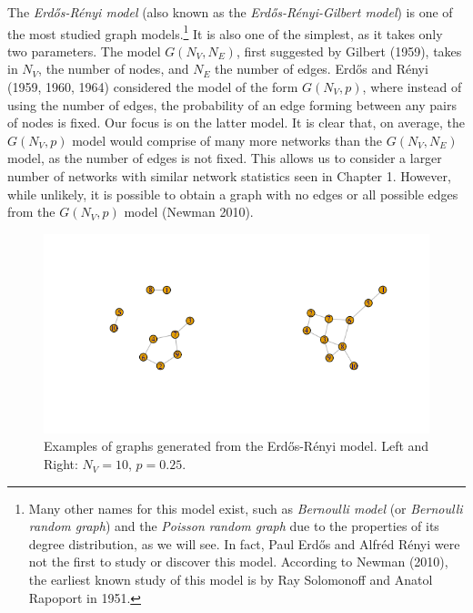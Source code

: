 \documentclass[12pt,twoside]{amherstthesis}
\begin{document}
  The \emph{Erdős-Rényi model} (also known as the
  \emph{Erdős-Rényi-Gilbert model}) is one of the most studied graph
  models.\footnote{Many other names for this model exist, such as
    \emph{Bernoulli model} (or \emph{Bernoulli random graph}) and the
    \emph{Poisson random graph} due to the properties of its degree
    distribution, as we will see. In fact, Paul Erdős and Alfréd Rényi
    were not the first to study or discover this model. According to
    Newman (2010), the earliest known study of this model is by Ray
    Solomonoff and Anatol Rapoport in 1951.} It is also one of the
  simplest, as it takes only two parameters. The model
  \(G(N_{V}, N_{E})\), first suggested by Gilbert (1959), takes in
  \(N_{V}\), the number of nodes, and \(N_{E}\) the number of edges. Erdős
  and Rényi (1959, 1960, 1964) considered the model of the form
  \(G(N_{V}, p)\), where instead of using the number of edges, the
  probability of an edge forming between any pairs of nodes is fixed. Our
  focus is on the latter model. It is clear that, on average, the
  \(G(N_{V}, p)\) model would comprise of many more networks than the
  \(G(N_{V}, N_{E})\) model, as the number of edges is not fixed. This
  allows us to consider a larger number of networks with similar network
  statistics seen in Chapter 1. However, while unlikely, it is possible to
  obtain a graph with no edges or all possible edges from the
  \(G(N_{V}, p)\) model (Newman 2010).
  
  \begin{figure}[htbp]
  \centering
  \includegraphics{figure/21erdosrenyiexample.png}
  \caption{Examples of graphs generated from the Erdős-Rényi model. Left
  and Right: \(N_V = 10\), \(p = 0.25\).}
  \end{figure}
  
\end{document}
